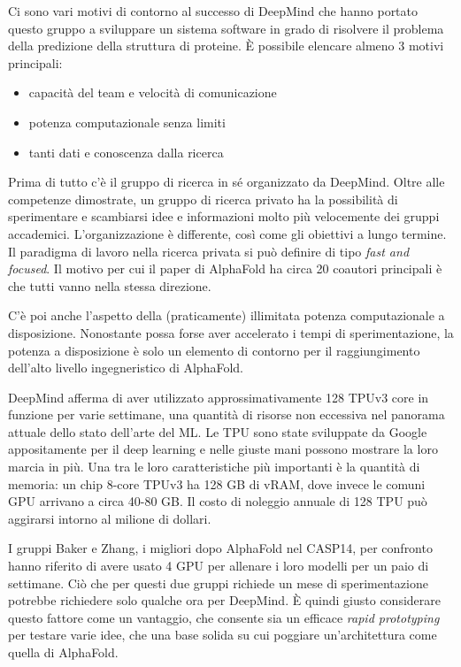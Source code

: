 {
Ci sono vari motivi di contorno al successo di DeepMind che hanno portato questo gruppo a sviluppare un sistema software in grado di risolvere il problema della predizione della struttura di proteine. È possibile elencare almeno 3 motivi principali:

\begin{itemize}
	\item capacità del team e velocità di comunicazione
	\item potenza computazionale senza limiti
	\item tanti dati e conoscenza dalla ricerca
\end{itemize}

Prima di tutto c'è il gruppo di ricerca in sé organizzato da DeepMind. Oltre alle competenze dimostrate, un gruppo di ricerca privato ha la possibilità di sperimentare e scambiarsi idee e informazioni molto più velocemente dei gruppi accademici. L'organizzazione è differente, così come gli obiettivi a lungo termine. Il paradigma di lavoro nella ricerca privata si può definire di tipo \textit{fast and focused}. Il motivo per cui il paper di AlphaFold ha circa 20 coautori principali è che tutti vanno nella stessa direzione.

\par C'è poi anche l'aspetto della (praticamente) illimitata potenza computazionale a disposizione. Nonostante possa forse aver accelerato i tempi di sperimentazione, la potenza a disposizione è solo un elemento di contorno per il raggiungimento dell'alto livello ingegneristico di AlphaFold.

\par DeepMind afferma di aver utilizzato approssimativamente 128 TPUv3 core in funzione per varie settimane, una quantità di risorse non eccessiva nel panorama attuale dello stato dell'arte del ML. Le TPU sono state sviluppate da Google appositamente per il deep learning e nelle giuste mani possono mostrare la loro marcia in più. Una tra le loro caratteristiche più importanti è la quantità di memoria: un chip 8-core TPUv3 ha 128 GB di vRAM, dove invece le comuni GPU arrivano a circa 40-80 GB. Il costo di noleggio annuale di 128 TPU può aggirarsi intorno al milione di dollari\supercite{blopigAF}.

\par I gruppi Baker e Zhang, i migliori dopo AlphaFold nel CASP14, per confronto hanno riferito di avere usato 4 GPU per allenare i loro modelli per un paio di settimane. Ciò che per questi due gruppi richiede un mese di sperimentazione potrebbe richiedere solo qualche ora per DeepMind. È quindi giusto considerare questo fattore come un vantaggio, che consente sia un efficace \textit{rapid prototyping} per testare varie idee, che una base solida su cui poggiare un'architettura come quella di AlphaFold.\\


}
